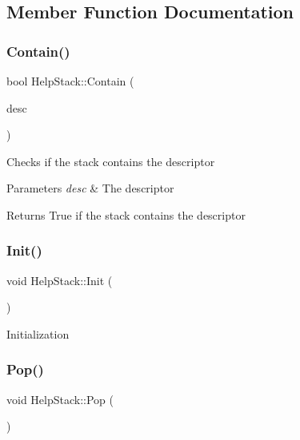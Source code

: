 \subsection{Member Function Documentation}
\mbox{\label{structHelpStack_a7fa3dd720f64464467158a74ac7c19c1}} 
\subsubsection{\texorpdfstring{Contain()}{Contain()}}
{\footnotesize\ttfamily bool Help\+Stack\+::\+Contain (\begin{DoxyParamCaption}\item[{\hyperlink{structDesc}{Desc} $\ast$}]{desc }\end{DoxyParamCaption})\hspace{0.3cm}{\ttfamily [inline]}}

Checks if the stack contains the descriptor


\begin{DoxyParams}{Parameters}
{\em desc} & The descriptor \\
\hline
\end{DoxyParams}
\begin{DoxyReturn}{Returns}
True if the stack contains the descriptor 
\end{DoxyReturn}
\mbox{\label{structHelpStack_ae91b62881ed5760e04f36a858d775fed}} 
\subsubsection{\texorpdfstring{Init()}{Init()}}
{\footnotesize\ttfamily void Help\+Stack\+::\+Init (\begin{DoxyParamCaption}{ }\end{DoxyParamCaption})\hspace{0.3cm}{\ttfamily [inline]}}

Initialization \mbox{\label{structHelpStack_a1e027e2dcf0c4bec15add32c0f04377a}} 
\subsubsection{\texorpdfstring{Pop()}{Pop()}}
{\footnotesize\ttfamily void Help\+Stack\+::\+Pop (\begin{DoxyParamCaption}{ }\end{DoxyParamCaption})\hspace{0.3cm}{\ttfamily [inline]}}


